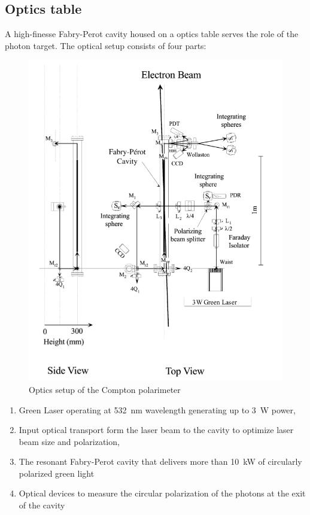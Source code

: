 \subsection{Optics table}
\label{sec:compton_optics}
A high-finesse Fabry-Perot cavity housed on a optics table serves the role of the photon target.
The optical setup consists of four parts:
\begin{figure}[htp]
    \begin{center}
        \includegraphics*[angle=0,width=\textwidth]{compton_optics_green}
    \end{center}
    \caption[compton:Optics Table]{
            Optics setup  of the  Compton polarimeter
            }
    \label{fig:compton_optics}
 \end{figure}

\begin{enumerate}
\item Green Laser operating at 532~nm wavelength generating up to 3~W power,
\item Input optical transport  form the laser beam to the cavity to optimize laser beam size and polarization,
\item The resonant Fabry-Perot cavity that delivers more than 10~kW of circularly polarized green light
\item Optical devices to measure the circular polarization of the photons at the exit of the cavity
\end{enumerate}


